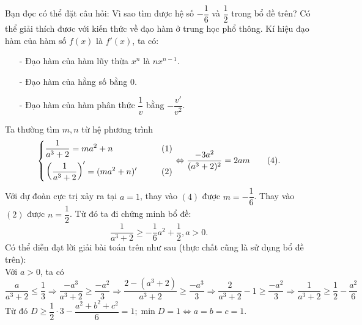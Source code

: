 \begin{bt}
{\begin{itemize}
		\end{itemize}
		\begin{note}
			Bạn đọc có thể đặt câu hỏi: Vì sao tìm được hệ số $-\dfrac{1}{6}$ và $\dfrac{1}{2}$ trong bổ đề trên? Có thể giải thích đươc với kiến thức về đạo hàm ở trung học phổ thông.  Kí hiệu đạo hàm của hàm số $f(x)$ là $f'(x)$, ta có:\begin{itemize}
				\item [-] Đạo hàm của hàm lũy thừa $x^n$ là $nx^{n-1}$.
				\item [-] Đạo hàm của hằng số bằng $0$.
				\item [-] Đạo hàm của hàm phân thức $\dfrac{1}{v}$ bằng $-\dfrac{v'}{v^2}$.
			\end{itemize}
			Ta thường tìm $m, n$ từ hệ phương trình
			\[\left\{\begin{aligned}&\dfrac{1}{a^3+2}=ma^2+n\hspace{2cm} (1)\\&\left(\dfrac{1}{a^3+2}\right)'=(ma^2+n)'\hspace{1cm}(2)\end{aligned}\right.\Leftrightarrow \dfrac{-3a^2}{(a^3+2)^2}=2am \tag{4}.\]
			Với dự đoàn cực trị xảy ra tại $a=1$, thay vào $(4)$ được $m=-\dfrac{1}{6}$. Thay vào $(2)$ được $n=\dfrac{1}{2}$. Từ đó ta  đi chứng minh bổ đề: $$\dfrac{1}{a^3+2}\geq -\dfrac{1}{6}a^2+\dfrac{1}{2}, a>0.$$
			Có thể diễn đạt lời giải bài toán trên như sau (thực chất cũng là sử dụng bổ đề trên): \\
			Với $a>0$, ta có 
			$$\dfrac{a}{a^3+2}\leq \dfrac{1}{3} \Rightarrow \dfrac{-a^3}{a^3+2}\geq \dfrac{-a^2}{3} \Rightarrow \dfrac{2-(a^3+2)}{a^3+2}\geq \dfrac{-a^3}{3} \Rightarrow \dfrac{2}{a^3+2}-1\geq \dfrac{-a^2}{3}\Rightarrow \dfrac{1}{a^3+2}\geq \dfrac{1}{2}-\dfrac{a^2}{6}$$
			Từ đó $D\geq \dfrac{1}{2}\cdot 3-\dfrac{a^2+b^2+c^2}{6}=1;\min D=1 \Leftrightarrow a=b=c=1$.
		\end{note}
	}
\end{bt}



